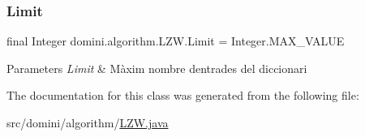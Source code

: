 \subsubsection{\texorpdfstring{Limit}{Limit}}
{\footnotesize\ttfamily final Integer domini.\+algorithm.\+L\+Z\+W.\+Limit = Integer.\+M\+A\+X\+\_\+\+V\+A\+L\+UE\hspace{0.3cm}{\ttfamily [package]}}


\begin{DoxyParams}{Parameters}
{\em Limit} & Màxim nombre d\textquotesingle{}entrades del diccionari \\
\hline
\end{DoxyParams}


The documentation for this class was generated from the following file\+:\begin{DoxyCompactItemize}
\item 
src/domini/algorithm/\hyperlink{LZW_8java}{L\+Z\+W.\+java}\end{DoxyCompactItemize}
